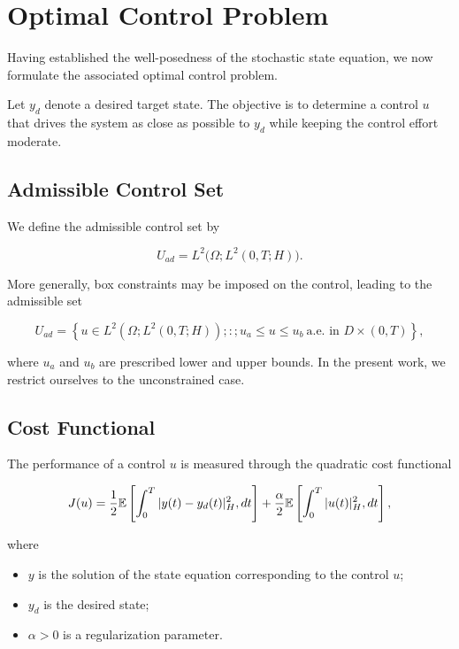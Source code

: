 \section{Optimal Control Problem}

Having established the well-posedness of the stochastic state equation, we now formulate the associated 
optimal control problem.

Let \(y_d\) denote a desired target state. The objective is to determine a control \(u\) that drives 
the system as close as possible to \(y_d\) while keeping the control effort moderate.

\subsection{Admissible Control Set}

We define the admissible control set by

\[
U_{ad}
=
L^2
\bigl(
\Omega;
L^2(0,T;H)
\bigr).
\]

More generally, box constraints may be imposed on the control, leading to the admissible set

\[
U_{ad}
=
\left\{
u\in L^2(\Omega;L^2(0,T;H))
;:;
u_a \le u \le u_b
\ \text{a.e. in } D\times(0,T)
\right\},
\]

where \(u_a\) and \(u_b\) are prescribed lower and upper bounds. In the present work, we 
restrict ourselves to the unconstrained case.

\subsection{Cost Functional}

The performance of a control \(u\) is measured through the quadratic cost functional

\begin{equation}
J(u)
=
\frac{1}{2}
\mathbb{E}
\left[
\int_0^T
|y(t)-y_d(t)|_H^2
,dt
\right]
+
\frac{\alpha}{2}
\mathbb{E}
\left[
\int_0^T
|u(t)|_H^2
,dt
\right],
\label{eq:cost}
\end{equation}

where

\begin{itemize}
\item \(y\) is the solution of the state equation corresponding to the control \(u\);
\item \(y_d\) is the desired state;
\item \(\alpha>0\) is a regularization parameter.
\end{itemize}

